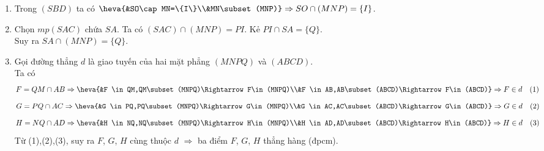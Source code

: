 \begin{vd}
{\begin{center}
		\end{center}
		\begin{enumerate}
			\item Trong $(SBD)$ ta có $\heva{&SO\cap MN=\{I\}\\&MN\subset(MNP)}\Rightarrow SO\cap(MNP)=\{I\}$.
			\item Chọn $mp(SAC)$ chứa $SA$.
			Ta có $(SAC)\cap(MNP)=PI$. Kẻ $PI\cap SA=\{Q\}$.\\
			Suy ra $SA\cap(MNP)=\{Q\}$.
			\item Gọi đường thẳng $d$ là giao tuyến của hai mặt phẳng $(MNPQ)$ và $(ABCD)$.\\
			Ta có 
			$$F=QM\cap AB \Rightarrow \heva{&F \in QM,QM\subset (MNPQ)\Rightarrow F\in(MNPQ)\\&F \in AB,AB\subset (ABCD)\Rightarrow F\in(ABCD)}\Rightarrow F\in d\quad (1)$$
			$$G=PQ\cap AC \Rightarrow \heva{&G \in PQ,PQ\subset (MNPQ)\Rightarrow G\in(MNPQ)\\&G \in AC,AC\subset (ABCD)\Rightarrow G\in(ABCD)}\Rightarrow G\in d\quad (2)$$
			$$H=NQ\cap AD \Rightarrow \heva{&H \in NQ,NQ\subset (MNPQ)\Rightarrow H\in(MNPQ)\\&H \in AD,AD\subset (ABCD)\Rightarrow H\in(ABCD)}\Rightarrow H\in d\quad (3)$$
			Từ (1),(2),(3), suy ra $F$, $G$, $H$ cùng thuộc $d$ $\Rightarrow$ ba điểm $F$, $G$, $H$ thẳng hàng (đpcm).
		\end{enumerate}	
	}
\end{vd}
